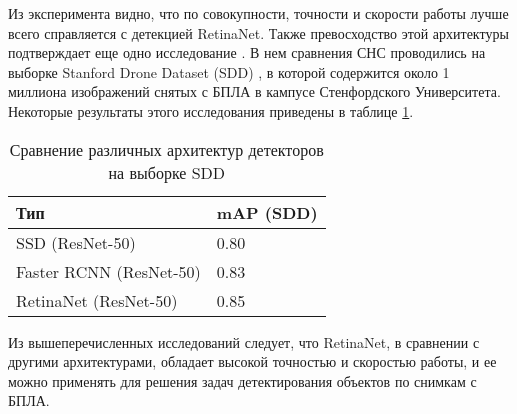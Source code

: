 Из эксперимента видно, что по совокупности, точности и скорости работы лучше всего справляется с детекцией RetinaNet. Также превосходство этой архитектуры подтверждает еще одно исследование \cite{lib-benchmark-sdd}. В нем сравнения СНС проводились на выборке Stanford Drone Dataset (SDD) \cite{lib-sdd}, в которой содержится около 1 миллиона изображений снятых с БПЛА в кампусе Стенфордского Университета. Некоторые результаты этого исследования приведены в таблице \ref{leaderboard-table-sdd}.

\begin{table}[H]
  \caption{Сравнение различных архитектур детекторов на выборке SDD}\label{leaderboard-table-sdd}
  \begin{tabular}{|p{7cm}|p{5cm}|}
    \hline
    {Тип} & {mAP (SDD)} \\
    \hline
    SSD (ResNet-50) & 0.80 \\
    \hline
    Faster RCNN (ResNet-50) & 0.83 \\
    \hline
    RetinaNet (ResNet-50) & 0.85 \\
    \hline
  \end{tabular}
\end{table}

Из вышеперечисленных исследований следует, что RetinaNet, в сравнении с другими архитектурами, обладает высокой точностью и скоростью работы, и ее можно применять для решения задач детектирования объектов по снимкам с БПЛА.
